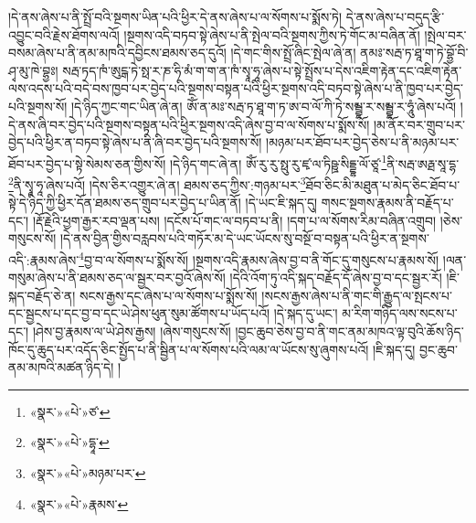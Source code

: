 །དེ་ནས་ཞེས་པ་ནི་སྤྲོ་བའི་སྔགས་ཡིན་པའི་ཕྱིར་དེ་ནས་ཞེས་པ་ལ་སོགས་པ་སྨོས་ཏེ། དེ་ནས་ཞེས་པ་བདུད་རྩི་འབྱུང་བའི་རྗེས་ཐོགས་ལའོ། །སྔགས་འདི་བཏབ་སྟེ་ཞེས་པ་ནི་སྤེལ་བའི་སྔགས་ཀྱིས་ཏེ་གོང་མ་བཞིན་ནོ། །སྤེལ་བར་བསམ་ཞེས་པ་ནི་ནམ་མཁའི་དབྱིངས་ཐམས་ཅད་དུའོ། །དེ་གང་གིས་སྤྲོ་ཞིང་སྤེལ་ཞེ་ན། ནམཿ་སརྦ་ཏ་ཐཱ་ག་ཏེ་བྷྱོ་བི་ཤྭ་མུ་ཁེ་བྷྱཿ། སརྦ་ཏད་ཁཾ་ཨུངྒ་ཏེ་སྥ་ར་ཎ་ཧི་མཾ་ག་ག་ན་ཁཾ་སྭཱ་ཧཱ་ཞེས་པ་སྟེ་སྤྲོས་པ་དེས་འཇིག་རྟེན་དང་འཇིག་རྟེན་ལས་འདས་པའི་བདེ་བས་ཁྱབ་པར་བྱེད་པའི་སྔགས་བསྟན་པའི་ཕྱིར་སྔགས་འདི་བཏབ་སྟེ་ཞེས་པ་ནི་ཁྱབ་པར་བྱེད་པའི་སྔགས་སོ། །དེ་ཉིད་ཀྱང་གང་ཡིན་ཞེ་ན། ཨོཾ་ན་མཿ་སརྦ་ཏ་ཐཱ་ག་ཏ་ཨ་བ་ལོ་ཀི་ཏེ་སམྦྷ་ར་སམྦྷ་ར་ཧཱུཾ་ཞེས་པའོ། །དེ་ནས་ཞི་བར་བྱེད་པའི་སྔགས་བསྟན་པའི་ཕྱིར་སྔགས་འདི་ཞེས་བྱ་བ་ལ་སོགས་པ་སྨོས་སོ། །མ་ནོར་བར་གྲུབ་པར་བྱེད་པའི་ཕྱིར་ན་བཏབ་སྟེ་ཞེས་པ་ནི་ཞི་བར་བྱེད་པའི་སྔགས་སོ། །མཉམ་པར་ཐོབ་པར་བྱེད་ཅེས་པ་ནི་མཉམ་པར་ཐོབ་པར་བྱེད་པ་སྟེ་སེམས་ཅན་གྱིས་སོ། །དེ་ཉིད་གང་ཞེ་ན། ཨོཾ་རུ་རུ་སྥུ་རུ་ཛྭ་ལ་ཏིཥྛ་སིདྡྷ་ལོ་ཙཱ་\footnote{«སྣར་»«པེ་»ཙ་}ནི་སརྦ་ཨརྠ་སཱ་དྷ་\footnote{«སྣར་»«པེ་»དྷཱ་}ནི་སྭཱ་ཧཱ་ཞེས་པའོ། །དེས་ཅིར་འགྱུར་ཞེ་ན། ཐམས་ཅད་ཀྱིས་:གཉམ་པར་\footnote{«སྣར་»«པེ་»མཉམ་པར་}ཐོབ་ཅིང་མི་མཐུན་པ་མེད་ཅིང་ཐོབ་པ་སྟེ་དེ་ཉིད་ཀྱི་ཕྱིར་དོན་ཐམས་ཅད་གྲུབ་པར་བྱེད་པ་ཡིན་ནོ། །དེ་ཡང་ཇི་སྐད་དུ། གསང་སྔགས་རྣམས་ནི་བརྗོད་པ་དང་། །རྡོ་རྗེའི་ཕྱག་རྒྱར་རབ་ལྡན་པས། །དངོས་པོ་གང་ལ་བཏབ་པ་ནི། །དག་པ་ལ་སོགས་རིམ་བཞིན་འགྲུབ། །ཅེས་གསུངས་སོ། །དེ་ནས་བྱིན་གྱིས་བརླབས་པའི་གཏོར་མ་དེ་ཡང་ཡོངས་སུ་བསྔོ་བ་བསྟན་པའི་ཕྱིར་ན་སྔགས་འདི་:རྣམས་ཞེས་\footnote{«སྣར་»«པེ་»རྣམས་}བྱ་བ་ལ་སོགས་པ་སྨོས་སོ། །སྔགས་འདི་རྣམས་ཞེས་བྱ་བ་ནི་གོང་དུ་གསུངས་པ་རྣམས་སོ། །ལན་གསུམ་ཞེས་པ་ནི་ཐམས་ཅད་ལ་སྦྱར་བར་བྱའོ་ཞེས་སོ། །དེའི་འོག་ཏུ་འདི་སྐད་བརྗོད་དོ་ཞེས་བྱ་བ་དང་སྦྱར་རོ། །ཇི་སྐད་བརྗོད་ཅེ་ན། སངས་རྒྱས་དང་ཞེས་པ་ལ་སོགས་པ་སྨོས་སོ། །སངས་རྒྱས་ཞེས་པ་ནི་གང་གི་རྒྱུད་ལ་སྤངས་པ་དང་སྦྱངས་པ་དང་བྱ་བ་དང་ཡེ་ཤེས་ཕུན་སུམ་ཚོགས་པ་ཡོད་པའོ། །དེ་སྐད་དུ་ཡང་། མ་རིག་གཉིད་ལས་སངས་པ་དང་། །ཤེས་བྱ་རྣམས་ལ་ཡེ་ཤེས་རྒྱས། །ཞེས་གསུངས་སོ། །བྱང་ཆུབ་ཅེས་བྱ་བ་ནི་གང་ནམ་མཁའ་ལྟ་བུའི་ཆོས་ཉིད་ཁོང་དུ་ཆུད་པར་འདོད་ཅིང་སྤྱོད་པ་ནི་སྦྱིན་པ་ལ་སོགས་པའི་ལམ་ལ་ཡོངས་སུ་ཞུགས་པའོ། །ཇི་སྐད་དུ། བྱང་ཆུབ་ནམ་མཁའི་མཚན་ཉིད་དེ། །
